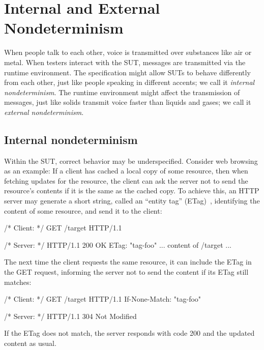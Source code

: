 \section{Internal and External Nondeterminism}
\label{sec:internal-external-nondeterminism}
When people talk to each other, voice is transmitted over substances like air or
metal.  When testers interact with the SUT, messages are transmitted via the
runtime environment.  The specification might allow SUTs to behave differently
from each other, just like people speaking in different accents; we call it {\em
internal nondeterminism}.  The runtime environment might affect the transmission
of messages, just like solids transmit voice faster than liquids and gases; we
call it {\em external nondeterminism}.

\subsection{Internal nondeterminism}
\label{sec:internal-nondeterminism}
Within the SUT, correct behavior may be \mbox{underspecified}.  Consider web
browsing as an example: If a client has cached a local copy of some resource,
then when fetching updates for the resource, the client can ask the server not
to send the resource's contents if it is the same as the cached copy.  To
achieve this, an HTTP server may generate a short string, called an ``entity
tag'' (ETag)~\cite{rfc7232}, identifying the content of some resource, and send
it to the client:
\begin{multicols}{2}
\begin{cpp}
  /* Client: */
  GET /target HTTP/1.1
\end{cpp}
\columnbreak
\begin{cpp}
  /* Server: */
  HTTP/1.1 200 OK
  ETag: "tag-foo"
  ... content of /target ...
\end{cpp}
\end{multicols}
The next time the client requests the same resource, it can include the ETag in
the GET request, informing the server not to send the content if its ETag still
matches:
\begin{multicols}{2}
\begin{cpp}
  /* Client: */
  GET /target HTTP/1.1
  If-None-Match: "tag-foo"
\end{cpp}
\columnbreak
\begin{cpp}
  /* Server: */
  HTTP/1.1 304 Not Modified
\end{cpp}
\end{multicols}
If the ETag does not match, the server responds with code 200 and the updated
content as usual.

